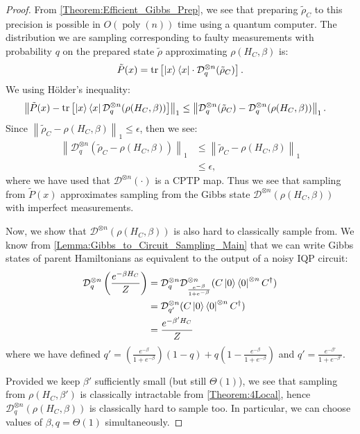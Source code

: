 \documentclass[a4paper,onecolumn,11pt,accepted=2017-05-09]{quantumarticle}
\newcommand{\norm}[1]{\left\lVert#1\right\rVert}
\newcommand{\ox}{\otimes}
\newcommand{\cD}{\mathcal{D}}
\newcommand{\trho}{\tilde{\rho}}
\DeclareMathOperator{\poly}{poly}
\DeclareMathOperator{\tr}{tr}
\begin{document}
	\begin{proof}
		From \cref{Theorem:Efficient_Gibbs_Prep}, we see that preparing $\trho_C$ to this precision is possible in $O(\poly(n))$ time using a quantum computer. The distribution we are sampling corresponding to faulty measurements with probability $q$ on the prepared state $\trho$ approximating $\rho(H_C, \beta)$ is:
		\begin{align*}
			\tilde{P}(x) = \tr\left[ \ket{x}\bra{x}\cdot \cD_q^{\ox n}(\trho_C)  \right].
		\end{align*}
		We using H\"older's inequality:
		\begin{align*}
			\norm{\tilde{P}(x) - \tr\left[ \ket{x}\bra{x} \cD_q^{\ox n}(\rho(H_C,\beta))  \right]}_{1} 
			&\leq \norm{ \cD_q^{\ox n}(\trho_C) -   \cD_q^{\ox n}(\rho(H_C,\beta))}_1.
		\end{align*}
		Since $\norm{\trho_C - \rho(H_C,\beta)}_1 \leq \epsilon$, then we see:
		\begin{align*}
			\norm{ \cD_q^{\ox n}(\trho_C -   \rho(H_C,\beta))}_1 &\leq \norm{ \trho_C -   \rho(H_C,\beta)}_1 \\
			&\leq \epsilon,
		\end{align*}
		where we have used that $\cD^{\ox n}(\cdot)$ is a CPTP map.
		Thus we see that sampling from $\tilde{P}(x)$ approximates sampling from the Gibbs state $\cD^{\ox n}(\rho(H_C,\beta))$ with imperfect measurements.
  
		Now, we show that $\cD^{\ox n}(\rho(H_C,\beta))$ is also hard to classically sample from. 
        We know from \cref{Lemma:Gibbs_to_Circuit_Sampling_Main} that we can write Gibbs states of parent Hamiltonians as equivalent to the output of a noisy IQP circuit:
		\begin{align*}
			\cD^{\ox n}_q\left(\frac{e^{-\beta H_C}}{Z} \right)&= \cD^{\ox n}_{q} \cD^{\ox n}_{\frac{e^{-\beta}}{1+e^{-\beta}}}(C\ket{0}\bra{0}^{\otimes n}C^\dagger) \\
            &= \cD^{\ox n }_{q'}(C\ket{0}\bra{0}^{\otimes n}C^\dagger)\\
            &= \frac{e^{-\beta' H_C}}{Z} 
		\end{align*}
	  where we have defined $q' =(\frac{e^{-\beta}}{1+e^{-\beta}})(1-q) + q(1-\frac{e^{-\beta}}{1+e^{-\beta}})$ and $ q' = \frac{e^{-\beta'}}{1+e^{-\beta'}}$. 
    
		Provided we keep $\beta'$ sufficiently small (but still $\Theta(1)$), we see that sampling from $\rho(H_C,\beta')$ is classically intractable from \cref{Theorem:4Local}, hence $\cD^{\ox n}_q(\rho(H_C,\beta))$ is classically hard to sample too.
    In particular, we can choose values of $\beta, q = \Theta(1)$ simultaneously.
	\end{proof}
\end{document}
